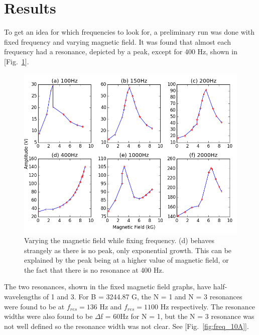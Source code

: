 \section{Results}
To get an idea for which frequencies to look for, a preliminary run was done with fixed frequency and varying magnetic field. It was found that almost each frequency had a resonance, depicted by a peak, except for 400 Hz, shown in [Fig.~\ref{fig:fixed_frequencys}].

\begin{figure}[H]
    \begin{center}
    \includegraphics[scale=0.46]{fixed_frequency.png} %
    \caption{Varying the magnetic field while fixing frequency. (d) behaves strangely as there is no peak, only exponential growth. This can be explained by the peak being at a higher value of magnetic field, or the fact that there is no resonance at 400 Hz.}
    \label{fig:fixed_frequencys}
    \end{center}
\end{figure}

The two resonances, shown in the fixed magnetic field graphs, have half-wavelengths of 1 and 3. For B = 3244.87 G, the N = 1 and N = 3 resonances were found to be at $f_{res} = 136$ Hz and $f_{res} = 1100$ Hz respectively. The resonance widths were also found to be $\Delta$f = 60Hz for N = 1, but the N = 3 resonance was not well defined so the resonance width was not clear. See [Fig.~\ref{fig:freq_10A}].

